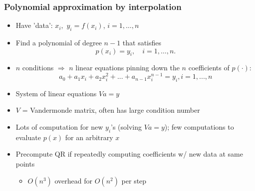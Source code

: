 \documentclass[bigger]{beamer}
\begin{document}
\begin{frame}%
\frametitle{Polynomial approximation by interpolation}

\begin{itemize}
\item Have 'data': $x_{i},$ $y_{i}=f\left( x_{i}\right) $, $i=1,\ldots ,n$

\item Find a polynomial of degree $n-1$ that satisfies 
\begin{equation*}
p(x_{i})=y_{i},\quad i=1,\ldots ,n.
\end{equation*}

\item $n$ conditions $\Rightarrow $ $n$ linear equations pinning down 
\newline
the $n$ coefficients of $p(\cdot )$:%
\begin{equation*}
a_{0}+a_{1}x_{i}+a_{2}x_{i}^{2}+...+a_{n-1}x_{i}^{n-1}=y_{i},i=1,...,n
\end{equation*}

\item System of linear equations $Va=y$

\item $V$ = Vandermonde matrix, often has large condition number

\item Lots of computation for new $y_{i}$'s (solving $Va=y$); \newline
few computations to evaluate $p\left( x\right) $ for an arbitrary $x$
\item Precompute QR if repeatedly computing coefficients w/ new data at same points
\begin{itemize}
\item $O(n^3)$ overhead for $O(n^2)$ per step
\end{itemize}

\end{itemize}


\end{frame}%
\end{document}
